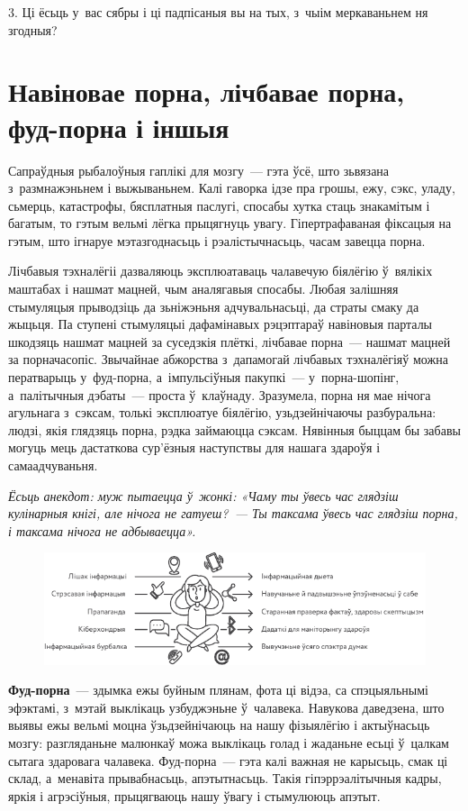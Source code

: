 3. Ці ёсьць у~вас сябры і ці падпісаныя вы на тых, з~чыім меркаваньнем ня згодныя?


\section{Навіновае порна, лічбавае порна, фуд-порна і іншыя}

Сапраўдныя рыбалоўныя гаплікі для мозгу~--- гэта ўсё, што зьвязана з~размнажэньнем і выжываньнем. Калі гаворка ідзе пра грошы, ежу, сэкс, уладу, сьмерць, катастрофы, бясплатныя паслугі, спосабы хутка стаць знакамітым і багатым, то гэтым вельмі лёгка прыцягнуць увагу. Гіпертрафаваная фіксацыя на гэтым, што ігнаруе мэтазгоднасьць і рэалістычнасьць, часам завецца порна.

Лічбавыя тэхналёгіі дазваляюць эксплюатаваць чалавечую біялёгію ў~вялікіх маштабах і нашмат мацней, чым аналягавыя спосабы. Любая залішняя стымуляцыя прыводзіць да зьніжэньня адчувальнасьці, да страты смаку да жыцьця. Па ступені стымуляцыі дафамінавых рэцэптараў навіновыя парталы шкодзяць нашмат мацней за суседзкія плёткі, лічбавае порна~--- нашмат мацней за порначасопіс. Звычайнае абжорства з~дапамогай лічбавых тэхналёгіяў можна ператварыць у~фуд-порна, а~імпульсіўныя пакупкі~--- у~порна-шопінг, а~палітычныя дэбаты~--- проста ў~клаўнаду. Зразумела, порна ня мае нічога агульнага з~сэксам, толькі эксплюатуе біялёгію, узьдзейнічаючы разбуральна: людзі, якія глядзяць порна, рэдка займаюцца сэксам. Нявінныя быццам бы забавы могуць мець дастаткова сур'ёзныя наступствы для нашага здароўя і самаадчуваньня.

\emph{Ёсьць анекдот: муж пытаецца ў~жонкі: «Чаму ты ўвесь час глядзіш кулінарныя кнігі, але нічога не гатуеш?~--- Ты таксама ўвесь час глядзіш порна, і таксама нічога не адбываецца».}

\begin{figure}[htb!]
  \centering
  \includegraphics[scale=1.5]{willpower/ch13/7.pdf}
\end{figure}

\textbf{Фуд-порна}~--- здымка ежы буйным плянам, фота ці відэа, са спэцыяльнымі эфэктамі, з~мэтай выклікаць узбуджэньне ў~чалавека. Навукова даведзена, што выявы ежы вельмі моцна ўзьдзейнічаюць на нашу фізыялёгію і актыўнасьць мозгу: разгляданьне малюнкаў можа выклікаць голад і жаданьне есьці ў~цалкам сытага здаровага чалавека. Фуд-порна~--- гэта калі важная не карысьць, смак ці склад, а~менавіта прывабнасьць, апэтытнасьць. Такія гіпэррэалітычныя кадры, яркія і агрэсіўныя, прыцягваюць нашу ўвагу і стымулююць апэтыт.

